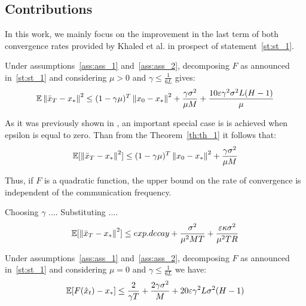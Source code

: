 \subsection{Contributions} \label{subsec:contributions}

In this work, we mainly focus on the improvement in the last term of both convergence rates provided by Khaled et al. in prospect of statement~\ref{st:st_1}.

\begin{theorem} \label{th:th_1}
    Under assumptions~\ref{ass:ass_1} and~\ref{ass:ass_2}, decomposing $F$ as announced in~\ref{st:st_1} and considering $\mu > 0$ and $\gamma \leq \frac{1}{6 L}$ gives:
    \begin{align}
        \mathbb{E} \left\|\bar{x}_T - x_*\right\|^2
        \leq
        (1 - \gamma \mu)^T \left\|x_0 - x_*\right\|^2 
        + \frac{\gamma \sigma^2}{\mu M} 
        + \frac{10 \varepsilon \gamma^2 \sigma^2 L (H-1)}{\mu}
    \end{align}
\end{theorem}

\begin{corollary} \label{}
    As it was previously shown in \cite{Woodworth}, an important special case is is achieved when epsilon is equal to zero. Than from the Theorem~\ref{th:th_1} it follows that:
    \begin{align}
        \mathbb{E}[\left\|\bar{x}_T - x_*\right\|^2]
        \leq
        (1 - \gamma \mu)^T \left\|x_0 - x_*\right\|^2 
        + \frac{\gamma \sigma^2}{\mu M}
    \end{align}
\end{corollary}

Thus, if $F$ is a quadratic function, the upper bound on the rate of convergence is independent of the communication frequency.

\begin{corollary} \label{}
    Choosing $\gamma$ .... Substituting ....
    \begin{align}
        \mathbb{E}[\left\|\bar{x}_T - x_*\right\|^2]
        \leq
        exp.decay +
        \frac{\sigma^2}{\mu^2 MT} + \frac{\varepsilon  \kappa \sigma^2}{\mu^2 TR}
    \end{align}
\end{corollary}



\begin{theorem} \label{th:th_2}
    Under assumptions~\ref{ass:ass_1} and~\ref{ass:ass_2}, decomposing $F$ as announced in~\ref{st:st_1} and considering $\mu = 0$ and $\gamma \leq \frac{1}{6 L}$ we have:
    \begin{align}
        \mathbb{E}[F(\hat{x}_t) - x_*] \leq
        \frac{2}{\gamma T} + \frac{2 \gamma \sigma^2}{M} + 20 \varepsilon \gamma^2 L \sigma^2 (H-1)
    \end{align}
\end{theorem}

